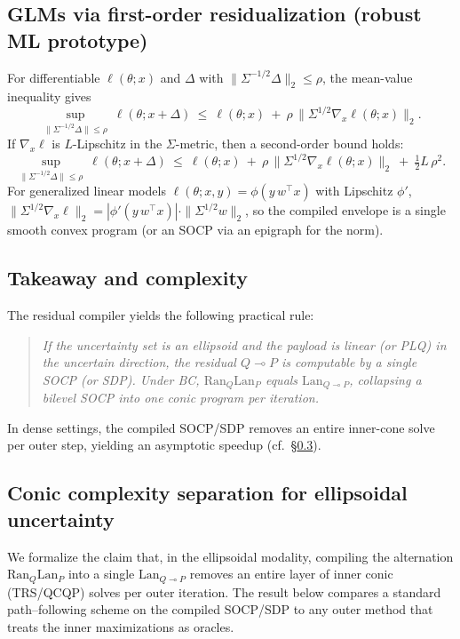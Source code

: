 \documentclass[11pt]{article}
\numberwithin{equation}{section}
\theoremstyle{upright}
\newcommand{\Lan}{\mathrm{Lan}}
\newcommand{\Ran}{\mathrm{Ran}}
\newcommand{\resid}{\multimap}
\begin{document}
\subsection{GLMs via first-order residualization (robust ML prototype)}
For differentiable $\ell(\theta;x)$ and $\Delta$ with $\|\Sigma^{-1/2}\Delta\|_2\le\rho$,
the mean-value inequality gives
\[
\sup_{\|\Sigma^{-1/2}\Delta\|\le\rho}\ \ell(\theta;x+\Delta)
\ \le\ \ell(\theta;x)\ +\ \rho\,\big\|\Sigma^{1/2}\nabla_x \ell(\theta;x)\big\|_2.
\]
If $\nabla_x \ell$ is $L$-Lipschitz in the $\Sigma$-metric, then a second-order bound holds:
\[
\sup_{\|\Sigma^{-1/2}\Delta\|\le\rho}\ \ell(\theta;x+\Delta)
\ \le\ \ell(\theta;x)\ +\ \rho\,\|\Sigma^{1/2}\nabla_x \ell(\theta;x)\|_2\ +\ \tfrac12 L\,\rho^2.
\]
For generalized linear models $\ell(\theta;x,y)=\phi(y\,w^\top x)$ with Lipschitz $\phi'$, 
$\|\Sigma^{1/2}\nabla_x\ell\|_2=|\phi'(y\,w^\top x)|\cdot \|\Sigma^{1/2}w\|_2$, so the compiled
envelope is a single smooth convex program (or an SOCP via an epigraph for the norm).

\subsection{Takeaway and complexity}
The residual compiler yields the following practical rule:
\begin{quote}
\emph{If the uncertainty set is an ellipsoid and the payload is linear (or PLQ) in the uncertain direction, the residual $Q\resid P$ is computable by a single SOCP (or SDP). Under BC, $\Ran_Q\Lan_P$ equals $\Lan_{Q\resid P}$, collapsing a bilevel SOCP into one conic program per iteration.}
\end{quote}
In dense settings, the compiled SOCP/SDP removes an entire inner-cone solve per outer step, yielding an asymptotic speedup (cf.\ \S\ref{sec:complexity-gap}).

\subsection{Conic complexity separation for ellipsoidal uncertainty}\label{sec:complexity-gap}

We formalize the claim that, in the ellipsoidal modality, compiling the alternation
$\Ran_Q\Lan_P$ into a single $\Lan_{Q\resid P}$ removes an entire layer of inner
conic (TRS/QCQP) solves per outer iteration. The result below compares a standard
path–following scheme on the compiled SOCP/SDP to any outer method that treats the
inner maximizations as oracles.
\end{document}
